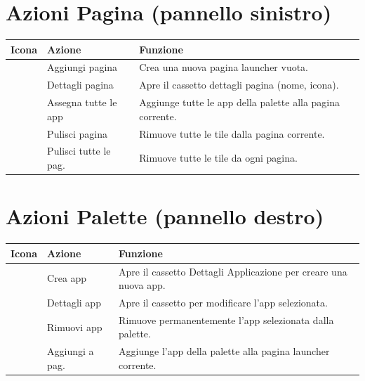 \section{Azioni Pagina (pannello sinistro)}

\begin{longtable}{C{1.5cm}L{4.0cm}L{8.2cm}}
\toprule
{}
\color{white}\sffamily\bfseries Icona &
\color{white}\sffamily\bfseries Azione &
\color{white}\sffamily\bfseries Funzione \\
\midrule
{}                    & Aggiungi pagina       & Crea una nuova pagina launcher vuota. \\
               & Dettagli pagina       & Apre il cassetto dettagli pagina (nome, icona). \\
    & Assegna tutte le app  & Aggiunge tutte le app della palette alla pagina corrente. \\
& Pulisci pagina       & Rimuove tutte le tile dalla pagina corrente. \\
  & Pulisci tutte le pag. & Rimuove tutte le tile da ogni pagina. \\
\bottomrule
\end{longtable}

\section{Azioni Palette (pannello destro)}

\begin{longtable}{C{1.5cm}L{4.0cm}L{8.2cm}}
\toprule
{}
\color{white}\sffamily\bfseries Icona &
\color{white}\sffamily\bfseries Azione &
\color{white}\sffamily\bfseries Funzione \\
\midrule
{}  & Crea app      & Apre il cassetto Dettagli Applicazione per creare una nuova app. \\
 & Dettagli app & Apre il cassetto per modificare l'app selezionata. \\
   & Rimuovi app   & Rimuove permanentemente l'app selezionata dalla palette. \\
   & Aggiungi a pag. & Aggiunge l'app della palette alla pagina launcher corrente. \\
\bottomrule
\end{longtable}


